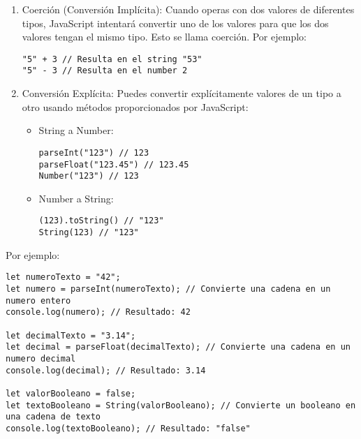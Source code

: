 \documentclass[executivepaper]{article}
\begin{document}
\begin{enumerate}
  \item Coerción (Conversión Implícita):
  Cuando operas con dos valores de diferentes tipos, JavaScript intentará convertir uno de los valores para que los dos valores tengan el mismo tipo. Esto se llama coerción. Por ejemplo:
\begin{lstlisting}
"5" + 3 // Resulta en el string "53"
"5" - 3 // Resulta en el number 2
\end{lstlisting}
  \item Conversión Explícita:
  Puedes convertir explícitamente valores de un tipo a otro usando métodos proporcionados por JavaScript:
  \begin{itemize}
    \item String a Number:
\begin{lstlisting}
parseInt("123") // 123
parseFloat("123.45") // 123.45
Number("123") // 123
\end{lstlisting}
\item Number a String:
\begin{lstlisting}
(123).toString() // "123"
String(123) // "123"
\end{lstlisting}
  \end{itemize}
\end{enumerate}
Por ejemplo:
\begin{lstlisting}
let numeroTexto = "42";
let numero = parseInt(numeroTexto); // Convierte una cadena en un numero entero
console.log(numero); // Resultado: 42

let decimalTexto = "3.14";
let decimal = parseFloat(decimalTexto); // Convierte una cadena en un numero decimal
console.log(decimal); // Resultado: 3.14

let valorBooleano = false;
let textoBooleano = String(valorBooleano); // Convierte un booleano en una cadena de texto
console.log(textoBooleano); // Resultado: "false"
\end{lstlisting}
\end{document}
